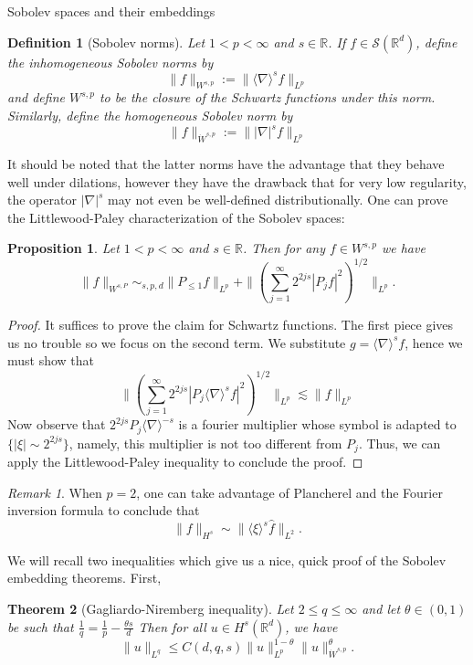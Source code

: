 \documentclass[11pt]{article}
\newtheorem{thm}{Theorem}
\newtheorem{prop}[thm]{Proposition}
\newtheorem*{defn}{Definition}
\theoremstyle{remark}
\newtheorem*{rmk}{Remark}
\newcommand{\calS}{\mathcal{S}}
\newcommand{\1}{\textbf{1}}
\newcommand{\lle}{\lesssim}
\def\norm#1{\| #1  \|}
\def\brac#1{\langle #1  \rangle}
\newcommand{\bbR}{\mathbb{R}}
\begin{document}
\newpage

{\noindent\Large Sobolev spaces and their embeddings}
\vspace{6mm}
\begin{defn}[Sobolev norms]
Let $1 < p < \infty$ and $s \in \bbR$. If $f \in \calS(\bbR^d)$, define the inhomogeneous Sobolev norms by
\[
\norm{f}_{W^{s,p}}:= \norm{\brac{\nabla}^s f}_{L^p}
\]
and define $W^{s,p}$ to be the closure of the Schwartz functions under this norm. Similarly, define the homogeneous Sobolev norm by
\[
\norm{f}_{\dot W^{s,p}}:= \norm{|\nabla|^s f}_{L^p}
\]
\end{defn}
It should be noted that the latter norms have the advantage that they behave well under dilations, however they have the drawback that for very low regularity, the operator $|\nabla|^s$ may not even be well-defined distributionally.
One can prove the Littlewood-Paley characterization of the Sobolev spaces: 
\begin{prop}
Let $1 < p < \infty$ and $s \in \bbR$. Then for any $f \in W^{s,p}$ we have
\[
\norm{f}_{W^{s,P}} \sim_{s,p,d} \norm{P_{\leq 1} f}_{L^p} + \norm{(\sum_{j=1}^\infty 2^{2js} |P_jf|^2)^{1/2}}_{L^p}.
\]
\end{prop}
\begin{proof}
It suffices to prove the claim for Schwartz functions. The first piece gives us no trouble so we focus on the second term. We substitute $g= \brac{\nabla}^s f$, hence we must show that
\[
\norm{(\sum_{j=1}^\infty 2^{2js} |P_j\brac{\nabla}^s f|^2)^{1/2}}_{L^p} \lle \norm{f}_{L^p}
\]
Now observe that $2^{2js} P_j \brac{\nabla}^{-s}$ is a fourier multiplier whose symbol is adapted to $\{|\xi| \sim 2^{2js}\}$, namely, this multiplier is not too different from $P_j$. Thus, we can apply the Littlewood-Paley inequality to conclude the proof. 
\end{proof}
\begin{rmk}
When $p=2$, one can take advantage of Plancherel and the Fourier inversion formula to conclude that
\[
\norm{f}_{H^s} \sim \norm{\brac{\xi}^s \hat{f}}_{L^2}.
\]
\end{rmk}
We will recall two inequalities which give us a nice, quick proof of the Sobolev embedding theorems. First, 
\begin{thm}[Gagliardo-Niremberg inequality]
Let $2 \leq q \leq \infty$ and let $\theta \in (0,1)$ be such that $\frac{1}{q} = \frac{1}{p} - \frac{\theta s}{d}$ Then for all $u \in H^s(\mathbb{R}^d)$, we have
\[
\|u\|_{L^q} \leq C(d,q,s) \|u\|_{L^p}^{1-\theta} \|u\|_{\dot W^{s,p}}^\theta.
\]
\end{thm}
\end{document}
